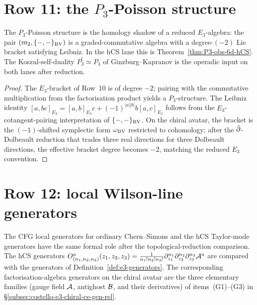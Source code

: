 \section{\texorpdfstring{Row 11: the $P_3$-Poisson structure}{Row 11: the P3-Poisson structure}}
\label{sec:cfg-row-11-p3-poisson}

\begin{theorem}
\label{thm:cfg-row-11}
The $P_3$-Poisson structure is the homology shadow of a reduced
$E_3$-algebra: the pair $(m_2,\{-,-\}_{\mathrm{BV}})$ is a
graded-commutative algebra with a degree-$(-2)$ Lie bracket satisfying
Leibniz. In the hCS lane this is
Theorem~\ref{thm:P3-obs-6d-hCS}. The Koszul-self-duality $P_3^!\simeq P_3$
of Ginzburg--Kapranov is the operadic input on both lanes after
reduction.
\end{theorem}

\begin{proof}
The $E_3$-bracket of Row~10 is of degree $-2$; pairing with the
commutative multiplication from the factorisation product yields a
$P_3$-structure. The Leibniz identity
$[a, bc]_{E_3} = [a,b]_{E_3}c + (-1)^{|a||b|}b[a,c]_{E_3}$
follows from the $E_3$-cotangent-pairing interpretation of
$\{-,-\}_{\mathrm{BV}}$. On the chiral avatar, the bracket is the
$(-1)$-shifted symplectic form $\omega_{\mathrm{BV}}$ restricted to
cohomology; after the $\bar\partial$-Dolbeault reduction that trades three
real directions for three Dolbeault directions, the effective bracket
degree becomes $-2$, matching the reduced $E_3$ convention.
\end{proof}

\section{Row 12: local Wilson-line generators}
\label{sec:cfg-row-12-local-obs}

\begin{theorem}
\label{thm:cfg-row-12}
The CFG local generators for ordinary Chern--Simons and the hCS
Taylor-mode generators have the same formal role after the
topological-reduction comparison. The hCS generators
$O^a_{(n_1,n_2,n_3)}(z_1,z_2,z_3) = \frac{1}{n_1!n_2!n_3!}
\partial_{z_1}^{n_1}\partial_{z_2}^{n_2}\partial_{z_3}^{n_3}\mathcal{A}^a$
are compared with the generators of
Definition~\ref{def:e3-generators}. The corresponding
factorisation-algebra generators on the chiral avatar are the three
elementary families (gauge field $\mathcal{A}$, antighost $\mathcal{B}$, and their
derivatives) of
items~(G1)--(G3) in \S\ref{subsec:costello-e3-chiral-ce-gen-rel}.
\end{theorem}

